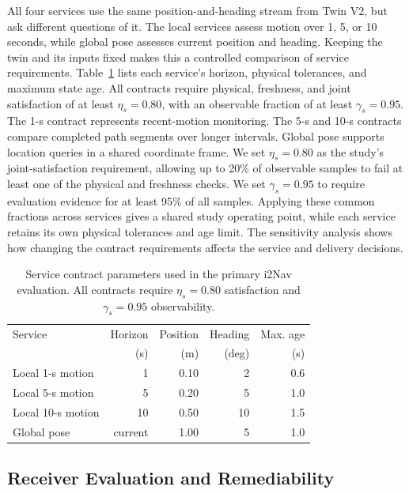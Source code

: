\documentclass[journal]{IEEEtran}
\newcommand{\newrev}[1]{{#1}}
\begin{document}
All four services use the same position-and-heading stream from Twin V2,
but ask different questions of it. The local services assess motion over
1, 5, or 10 seconds, while global pose assesses current position and
heading. Keeping the twin and its inputs fixed makes this a controlled
comparison of service requirements. Table~\ref{tab:exp_services} lists
each service's horizon, physical tolerances, and maximum state age. All
contracts require physical, freshness, and joint satisfaction of at least
$\eta_s=0.80$, with an observable fraction of at least $\gamma_s=0.95$.
\newrev{The 1-s contract represents recent-motion monitoring. The 5-s and
10-s contracts compare completed path segments over longer intervals.
Global pose supports location queries in a shared coordinate frame.
We set $\eta_s=0.80$ as the study's joint-satisfaction requirement,
allowing up to 20\% of observable samples to fail at least one of the
physical and freshness checks. We set $\gamma_s=0.95$ to require
evaluation evidence for at least 95\% of all samples. Applying these
common fractions across services gives a shared study operating point,
while each service retains its own physical tolerances and age limit.
The sensitivity analysis shows how changing the contract requirements
affects the service and delivery decisions.}

\begin{table}[!tb]
\centering
\caption{Service contract parameters used in the primary i2Nav evaluation. All contracts require $\eta_s=0.80$ satisfaction and $\gamma_s=0.95$ observability.}
\label{tab:exp_services}
\small
\begin{tabular}{lrrrr}
\toprule
Service & Horizon & Position & Heading & Max. age\\
 & (s) & (m) & (deg) & (s)\\
\midrule
Local 1-s motion  & 1 & 0.10 & 2  & 0.6\\
Local 5-s motion  & 5 & 0.20 & 5  & 1.0\\
Local 10-s motion & 10 & 0.50 & 10 & 1.5\\
Global pose       & current & 1.00 & 5 & 1.0\\
\bottomrule
\end{tabular}
\end{table}

\subsection{Receiver Evaluation and Remediability}
\end{document}

